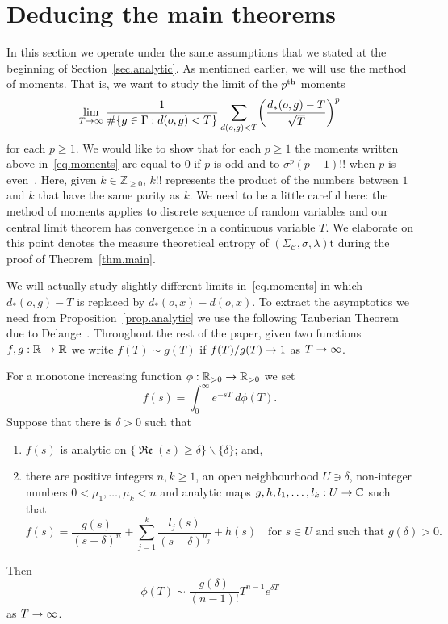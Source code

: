 \documentclass[AHL,Unicode,longabstracts,published]{cedram}
\newcommand{\G}{\Gamma}
\newcommand{\Cc}{\mathcal{C}}
\newcommand{\C}{\mathbb{C}}
\newcommand{\R}{\mathbb{R}}
\newcommand{\Z}{\mathbb{Z}}
\DeclareMathOperator{\fkRe}{\mathfrak{Re}}
\let\originalleft\left
\let\originalright\right
\renewcommand{\left}{\mathopen{}\mathclose\bgroup\originalleft}
\renewcommand{\right}{\aftergroup\egroup\originalright}
\renewcommand*{\to}{\mathchoice{\longrightarrow}{\rightarrow}{\rightarrow}{\rightarrow}}
\theoremstyle{plain}
\newcommand{\G}{\Gamma}
\begin{document}
\section{Deducing the main theorems}\label{sec.proofs}


In this section we operate under the same assumptions that we stated at the beginning of Section~\ref{sec.analytic}. As mentioned earlier, we will use the method of moments. That is, we want to study the limit of the $p^{\rm th}$ moments
\begin{equation}\label{eq.moments}
\lim_{T\to\infty} \frac{1}{\#\{ g\in\G: d(o,g) < T\}} \sum_{d(o,g) < T} \left(\frac{d_\ast(o,g) - T}{\sqrt{T}} \right)^p
\end{equation}
for each $p\ge 1$. We would like to show that for each $p\ge 1$ the moments written above in~\eqref{eq.moments} are equal to $0$ if $p$ is odd and to $\sigma^p (p-1)!!$ when $p$ is even~\cite[Theorem~30.2]{billingsley}. Here, given $k \in \Z_{\ge 0}$, $k!!$ represents the product of the numbers\pagebreak{} between $1$ and $k$ that have the same parity as $k$. We need to be a little careful here: the method of moments applies to discrete sequence of random variables and our central limit theorem has convergence in a continuous variable $T$. We elaborate on this point denotes the measure theoretical entropy of $(\Sigma_\Cc, \sigma, \lambda)$t during the proof of Theorem~\ref{thm.main}.



We will actually study slightly different limits in~\eqref{eq.moments} in which $d_\ast(o,g) - T$ is replaced by $d_\ast(o,x) - d(o,x)$. To extract the asymptotics we need from Proposition~\ref{prop.analytic} we use the following {Tauberian Theorem} due to Delange~\cite[Theorem~III]{Delange}. Throughout the rest of the paper, given two functions $f,g : \R \to \R$ we write $f(T) \sim g(T)$ if $f(T)/g(T) \to 1$ as $T\to\infty$.

\begin{prop}\label{prop.tau}
For a monotone increasing function $\phi : \R_{>0} \to \R_{>0}$ we set
\[
f(s) = \int_0^{\infty} e^{-sT} \ d\phi(T).
\]
Suppose that there is $\delta > 0$ such that
\begin{enumerate}
\item\label{prop3.1.1} $f(s)$ is analytic on $\{\fkRe(s) \ge \delta\} \backslash \{\delta\}$; and,
\item\label{prop3.1.2} there are positive integers $n, k \ge 1$, an open neighbourhood $U \ni \delta$, non-integer numbers $0 < \mu_1, \dots, \mu_k < n$ and analytic maps $g,h, l_1, \dots, l_k : U \to \C$ such that
\[
f(s) = \frac{g(s)}{(s-\delta)^n} + \sum_{j=1}^k \frac{l_j(s)}{(s-\delta)^{\mu_j}}+ h(s) \quad \text{for $s \in U$ and such that $g(\delta) > 0$}.
\]
\end{enumerate}
Then
\[
\phi(T) \sim \frac{g(\delta)}{(n-1)!} T^{n-1} e^{\delta T}
\]
as $T\to\infty$.
\end{prop}
\end{document}
